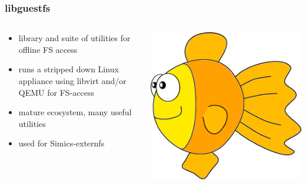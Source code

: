 

\begin{frame}
    \frametitle{libguestfs}
        \begin{columns}[c]
            \begin{column}{.45\textwidth}
                \begin{itemize}
                    \item library and suite of utilities for offline FS access
                    \item runs a stripped down Linux appliance using libvirt and/or QEMU for FS-access
                    \item mature ecosystem, many useful utilities
                    \item used for Simics-externfs
                \end{itemize}
            \end{column}
            \begin{column}{.30\textwidth}
\includegraphics[width=.9\textwidth]{frames/img/libguestfs_logo}
            \end{column}
        \end{columns}

    
\end{frame}
